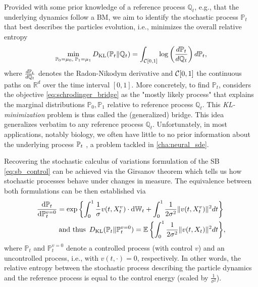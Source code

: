Provided with some prior knowledge of a reference process $\mathbb{Q}_t$, e.g., that the underlying dynamics follow a \acrfull{BM}, we aim to identify the stochastic process $\mathbb{P}_t$ that best describes the particles evolution, i.e., minimizes the overall relative entropy
\begin{equation}
	\label{eq:schrodinger_bridge}
	\min_{ \substack{ \mathbb{P}_{{0}} = \mu_0, \; \mathbb{P}_{{1}} = \mu_1} } D_{\mathrm{KL}}(\mathbb{P}_{{t}} \| \mathbb{Q}_{ t }) = \int_{{\mathcal{C}}[0,1]} \log \left( \frac{d\mathbb{P}_{{t}}}{d \mathbb{Q}_{ t }} \right) d\mathbb{P}_{{t}},
\end{equation}
where $\frac{d\mathbb{P}_{{t}}}{d\mathbb{Q}_{ t }}$ denotes the Radon-Nikodym derivative and ${\mathcal{C}}[0,1]$ the continuous paths on $\mathbb{R}^d$ over the time interval $[0, 1]$.
More concretely, to find $\mathbb{P}_t$, \citet{schrodinger1931umkehrung, schrodinger1932theorie} considers the objective \eqref{eq:schrodinger_bridge} as the "mostly likely process" that explains the marginal distributions $\mathbb{P}_0, \mathbb{P}_1$ relative to reference process $\mathbb{Q}_t$.
This \emph{KL-minimization} problem is thus called the (generalized) \citeauthor{schrodinger1931umkehrung} bridge.
This idea generalizes verbatim to any reference process $\mathbb{Q}_t$. Unfortunately, in most applications, notably biology, we often have little to no prior information about the underlying process $\mathbb{P}_{{t}}$ \citep{liberali2014hierarchical}, a problem tackled in \cref{cha:neural_sde}.

Recovering the stochastic calculus of variations formulation of the \acrlong{SB} \eqref{eq:sb_control} can be achieved via the Girsanov theorem which tells us how stochastic processes behave under changes in measure. The equivalence between both formulations can be then established via
\begin{align*}
	\frac{\mathrm{d}\mathbb{P}_{t}}{\mathrm{d} \mathbb{P}^{v=0}_t} = \exp \left\{ \int_0^1 \frac{1}{\sigma} v(t, X_t^v) \cdot \mathrm{d} \mathbb{W}_t +  \int_0^1 \frac{1}{2\sigma^2} \lVert v(t, X_t^v)\rVert^2 dt \right\}& \\
	\text{and thus} \enspace D_{\mathrm{KL}}(\mathbb{P}_{t} \| \mathbb{P}^{v=0}_t) = \mathbb{E} \left\{ \int_0^1 \frac{1}{2\sigma^2}\lVert v(t, X_t)\rVert^2 dt \right\}& ,
\end{align*}
where $\mathbb{P}_t$ and $\mathbb{P}^{v=0}_t$ denote a controlled process (with control $v$) and an uncontrolled process, i.e., with $v(t, \cdot)=0$, respectively.
In other words, the relative entropy between the stochastic process describing the particle dynamics and the reference process is equal to the control energy (scaled by $\frac{1}{\sigma^2}$).

